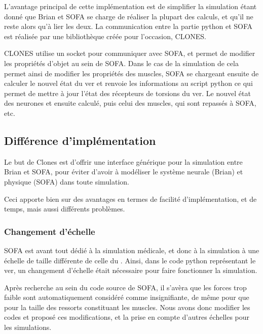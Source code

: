 L'avantage principal de cette implémentation est de simplifier la simulation
étant donné que Brian et SOFA se charge de réaliser la plupart des calculs, et
qu'il ne reste alors qu'à lier les deux. La communication entre la partie
python et SOFA est réalisée par une bibliothèque créée pour l'occasion, CLONES.

CLONES utilise un socket pour communiquer avec SOFA, et permet de modifier les
propriétés d'objet au sein de SOFA. Dans le cas de la simulation de \celeg{}
cela permet ainsi de modifier les propriétés des muscles, SOFA se chargeant
ensuite de calculer le nouvel état du ver et renvoie les informations au script
python ce qui permet de mettre à jour l'état des récepteurs de torsions du ver.
Le nouvel état des neurones et ensuite calculé, puis celui des muscles, qui
sont repassés à SOFA, etc.


\subsection{Différence d'implémentation} %
\label{sub:Différence d'implémentation}

Le but de Clones est d'offrir une interface générique pour
la simulation entre Brian et SOFA, pour éviter d'avoir à modéliser
le système neurale (Brian) et physique (SOFA) dans toute simulation.

Ceci apporte bien sur des avantages en termes de facilité d'implémentation,
et de temps, mais aussi différents problèmes.

\subsubsection{Changement d'échelle} %
\label{subs:Changement d'échelle}

SOFA est avant tout dédié à la simulation médicale, et donc à la simulation à
une échelle de taille différente de celle du \celeg{}. Ainsi, dans le code
python représentant le ver, un changement d'échelle était nécessaire pour faire
fonctionner la simulation.

Après recherche au sein du code source de SOFA, il s'avèra que les forces trop
faible sont automatiquement considéré comme insignifiante, de même pour que
pour la taille des ressorts constituant les muscles. Nous avons donc modifier
les codes et proposé ces modifications, et la prise en compte d'autres échelles
pour les simulations.\\


